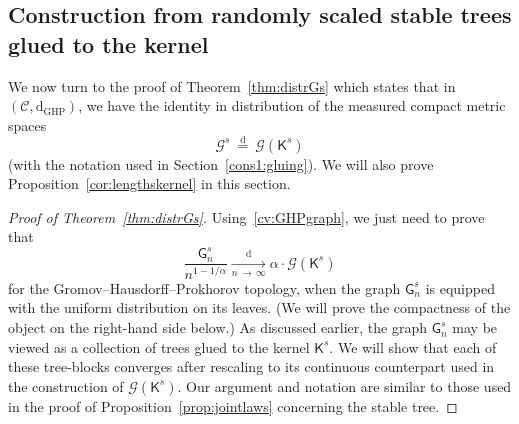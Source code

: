\documentclass[10pt]{amsart}
\theoremstyle{definition}\newtheorem{defi}[theo]{Definition}\newtheorem{rema}[theo]{Remark}\newtheorem{exam}[theo]{Example}\newtheorem{exem}[theo]{Example}\newtheorem{nota}[theo]{Notation}
\newcommand{\GHP}{\mathrm{GHP}}
\newcommand{\rmd}{\mathrm{d}}
\newcommand{\cG}{\mathcal{G}}
\newcommand{\sG}{\mathsf{G}}
\newcommand{\sK}{\mathsf{K}}
\newcommand{\scrC}{\mathscr{C}}
\begin{document}
\subsection{Construction from randomly scaled stable trees glued to the kernel}\label{sec:distrGs}

We now turn to the proof of Theorem~\ref{thm:distrGs} which states that in $(\scrC, \rmd_{\GHP})$, we have the identity in distribution of the measured compact metric spaces
\begin{equation}\label{distrGs}
\cG^s \ \overset{\rmd}= \ \cG\left(\sK^s\right)
\end{equation}
(with the notation used in Section~\ref{cons1:gluing}). We will also prove Proposition~\ref{cor:lengthskernel} in this section.

\begin{proof}[Proof of Theorem~\ref{thm:distrGs}]
Using~\eqref{cv:GHPgraph}, we just need to prove that
\[
\frac{\sG_n^s}{n^{1-1/\alpha}} \underset{n \,\rightarrow\,\infty}{\overset{\rmd}\longrightarrow} \alpha \cdot \cG(\sK^s)
\]
for the Gromov--Hausdorff--Prokhorov topology, when the graph $\sG_n^s$ is equipped with the uniform distribution on its leaves. (We will prove the compactness of the object on the right-hand side below.) As discussed earlier, the graph $\sG_n^s$ may be viewed as a collection of trees glued to the kernel $\sK^s$. We will show that each of these tree-blocks converges after rescaling to its continuous counterpart used in the construction of $\cG(\sK^s)$. Our argument and notation are similar to those used in the proof of Proposition~\ref{prop:jointlaws} concerning the stable tree.


\end{proof}
\end{document}

